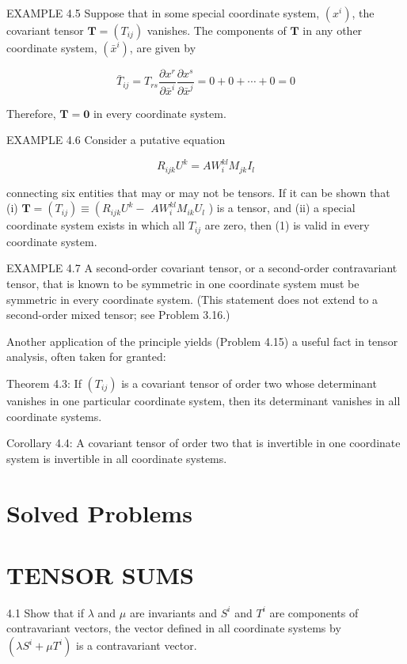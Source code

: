 \documentclass[10pt]{article}
\begin{document}
EXAMPLE 4.5 Suppose that in some special coordinate system, $\left(x^{i}\right)$, the covariant tensor $\mathbf{T}=\left(T_{i j}\right)$ vanishes. The components of $\mathbf{T}$ in any other coordinate system, $\left(\bar{x}^{i}\right)$, are given by

$$
\bar{T}_{i j}=T_{r s} \frac{\partial x^{r}}{\partial \bar{x}^{i}} \frac{\partial x^{s}}{\partial \bar{x}^{j}}=0+0+\cdots+0=0
$$

Therefore, $\mathbf{T}=\mathbf{0}$ in every coordinate system.

EXAMPLE 4.6 Consider a putative equation


\begin{equation*}
R_{i j k} U^{k}=A W_{i}^{k l} M_{j k} I_{l} \tag{1}
\end{equation*}


connecting six entities that may or may not be tensors. If it can be shown that (i) $\mathbf{T}=\left(T_{i j}\right) \equiv\left(R_{i j k} U^{k}-\right.$ $A W_{i}^{k l} M_{i k} U_{l}$ ) is a tensor, and (ii) a special coordinate system exists in which all $T_{i j}$ are zero, then (1) is valid in every coordinate system.

EXAMPLE 4.7 A second-order covariant tensor, or a second-order contravariant tensor, that is known to be symmetric in one coordinate system must be symmetric in every coordinate system. (This statement does not extend to a second-order mixed tensor; see Problem 3.16.)

Another application of the principle yields (Problem 4.15) a useful fact in tensor analysis, often taken for granted:

Theorem 4.3: If $\left(T_{i j}\right)$ is a covariant tensor of order two whose determinant vanishes in one particular coordinate system, then its determinant vanishes in all coordinate systems.

Corollary 4.4: A covariant tensor of order two that is invertible in one coordinate system is invertible in all coordinate systems.

\section*{Solved Problems}
\section*{TENSOR SUMS}
4.1 Show that if $\lambda$ and $\mu$ are invariants and $S^{i}$ and $T^{i}$ are components of contravariant vectors, the vector defined in all coordinate systems by $\left(\lambda S^{i}+\mu T^{i}\right)$ is a contravariant vector.
\end{document}
